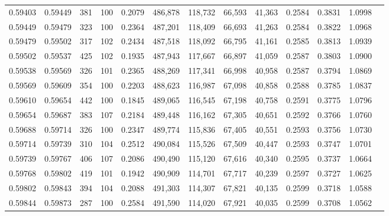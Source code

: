 \begin{tabular}{rrrrrrrrrrrrr}
0.59403 & 0.59449 &   381 & 100 &                                     0.2079 & 486,878 & 118,732 &  66,593 &  41,363 & 0.2584 & 0.3831 & 1.0998 \\
0.59449 & 0.59479 &   323 & 100 &                                     0.2364 & 487,201 & 118,409 &  66,693 &  41,263 & 0.2584 & 0.3822 & 1.0968 \\
0.59479 & 0.59502 &   317 & 102 &                                     0.2434 & 487,518 & 118,092 &  66,795 &  41,161 & 0.2585 & 0.3813 & 1.0939 \\
0.59502 & 0.59537 &   425 & 102 &                                     0.1935 & 487,943 & 117,667 &  66,897 &  41,059 & 0.2587 & 0.3803 & 1.0900 \\
0.59538 & 0.59569 &   326 & 101 &                                     0.2365 & 488,269 & 117,341 &  66,998 &  40,958 & 0.2587 & 0.3794 & 1.0869 \\
0.59569 & 0.59609 &   354 & 100 &                                     0.2203 & 488,623 & 116,987 &  67,098 &  40,858 & 0.2588 & 0.3785 & 1.0837 \\
0.59610 & 0.59654 &   442 & 100 &                                     0.1845 & 489,065 & 116,545 &  67,198 &  40,758 & 0.2591 & 0.3775 & 1.0796 \\
0.59654 & 0.59687 &   383 & 107 &                                     0.2184 & 489,448 & 116,162 &  67,305 &  40,651 & 0.2592 & 0.3766 & 1.0760 \\
0.59688 & 0.59714 &   326 & 100 &                                     0.2347 & 489,774 & 115,836 &  67,405 &  40,551 & 0.2593 & 0.3756 & 1.0730 \\
0.59714 & 0.59739 &   310 & 104 &                                     0.2512 & 490,084 & 115,526 &  67,509 &  40,447 & 0.2593 & 0.3747 & 1.0701 \\
0.59739 & 0.59767 &   406 & 107 &                                     0.2086 & 490,490 & 115,120 &  67,616 &  40,340 & 0.2595 & 0.3737 & 1.0664 \\
0.59768 & 0.59802 &   419 & 101 &                                     0.1942 & 490,909 & 114,701 &  67,717 &  40,239 & 0.2597 & 0.3727 & 1.0625 \\
0.59802 & 0.59843 &   394 & 104 &                                     0.2088 & 491,303 & 114,307 &  67,821 &  40,135 & 0.2599 & 0.3718 & 1.0588 \\
0.59844 & 0.59873 &   287 & 100 &                                     0.2584 & 491,590 & 114,020 &  67,921 &  40,035 & 0.2599 & 0.3708 & 1.0562 \\

\end{tabular}
